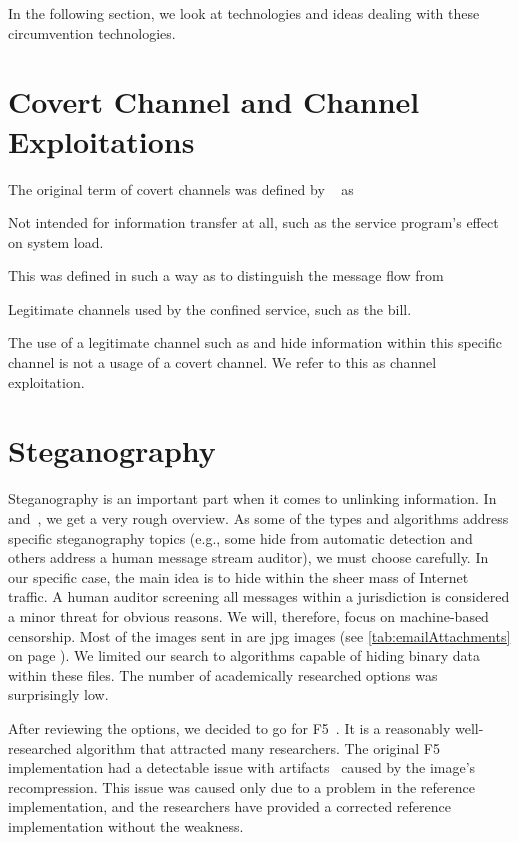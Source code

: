 In the following section, we look at technologies and ideas dealing with these circumvention technologies.

\section{Covert Channel and Channel Exploitations}
The original term of covert channels was defined by \citeauthor{Lampson73anote}~\cite{Lampson73anote} as 

\begin{shadequote}{}
	Not intended for information transfer at all, such as the service program's effect on system load.
\end{shadequote}

This was defined  in such a way as to distinguish the message flow from 

\begin{shadequote}{}
	Legitimate channels used by the confined service, such as the bill.
\end{shadequote}

The use of a legitimate channel such as  and hide information within this specific channel is not a usage of a covert channel. We refer to this as channel exploitation.

\section{Steganography}
Steganography is an important part when it comes to unlinking information. In~\cite{6828087} and~\cite{subhedar2014current}, we get a very rough overview. As some of the types and algorithms address specific steganography topics (e.g., some hide from automatic detection and others address a human message stream auditor), we must choose carefully. In our specific case, the main idea is to hide within the sheer mass of Internet traffic. A human auditor screening all messages within a jurisdiction is considered a minor threat for obvious reasons. We will, therefore,  focus on machine-based censorship. Most of the images sent in  are jpg images (see \cref{tab:emailAttachments} on page \pageref{tab:emailAttachments}). We limited our search to algorithms capable of hiding binary data within these files. The number of academically researched options was surprisingly low.

After reviewing the options, we decided to go for F5~\cite{f5}. It is a reasonably well-researched algorithm that attracted many researchers. The original F5 implementation had a detectable issue with artifacts~\cite{F5broken} caused by the image's recompression. This issue was caused only due to a problem in the reference implementation, and the researchers have provided a corrected reference implementation without the weakness.

